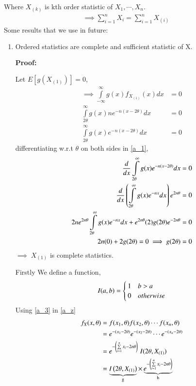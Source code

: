 \documentclass[journal,12pt,twocolumn]{IEEEtran}
\begin{document}
Where $X_{(k)}$ is kth order statistic of $X_1,\cdots,X_n$.
\begin{align}
    \implies \sum\limits_{i=1}^n X_i = \sum\limits_{i=1}^n X_{(i)}\label{a_2}
\end{align}
Some results that we use in future:
\begin{enumerate}
    \item Ordered statistics are complete and sufficient statistic of X.
    
    \textbf{Proof:} 

    Let $E[g(X_{(1)})]=0$,
    \begin{align}
        \implies\int\limits_{-\infty}^{\infty} g(x) f_{X_{(1)}}(x) dx&=0\\
        \int\limits_{2\theta}^{\infty} g(x) n e^{-n(x-2\theta)} dx &=0\\
        \int\limits_{2\theta}^{\infty} g(x) e^{-n(x-2\theta)} dx &=0\label{a_1}
    \end{align}
    differentiating w.r.t $\theta$ on both sides in \eqref{a_1},
    \begin{align}
      \nonumber  \dfrac{d}{dx} \int\limits_{2\theta}^{\infty} g(x) e^{-n(x-2\theta)} dx =0\\
     \nonumber   \dfrac{d}{dx} \left(\int\limits_{2\theta}^{\infty} g(x) e^{-nx} dx\right) e^{2n\theta} =0\\
     \nonumber   2n e^{2n\theta}\int\limits_{2\theta}^{\infty} g(x) e^{-nx} dx+e^{2n\theta}(2)g(2\theta)e^{-2n\theta}=0\\
     \nonumber2n(0)+2g(2\theta)=0\implies g(2\theta)=0
    \end{align}
    $\implies\;X_{(1)}$ is complete statistics.
    
    Firstly We define a function,
    \begin{align}
        I{\left(a,b\right)}=
        \begin{cases}
        1 & b>a
        \\
        0 & otherwise\label{a_3}
        \end{cases}
    \end{align}
    Using \eqref{a_3} in \eqref{a_z}
    \begin{align}
        f_X(x,\theta)&=f(x_1,\theta)f(x_2,\theta)\cdots f(x_n,\theta)\\
        &=e^{-(x_1-2\theta)}e^{-(x_2-2\theta)}\cdots e^{-(x_n-2\theta)}\\
        &=e^{-\left(\sum\limits_{i=1}^n x_i-2n\theta\right)}\;{I({2\theta,X_{(1)}})}\label{a_z}\\
        &=\underbrace{I\left(2\theta,X_{(1)}\right) }_\text{g}\times\underbrace{e^{-\left(\sum\limits_{i=1}^n x_i-2n\theta\right)}}_\text{h}
    \end{align}
    

\end{enumerate}
\end{document}
